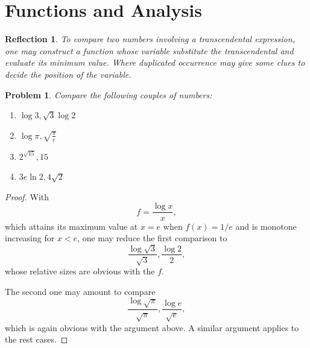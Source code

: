 \documentclass{ctexart}
\newtheorem{refl}{Reflection}
\newtheorem{prob}{Problem}
\newcommand{\pare}[1]{\left(#1\right)}
\begin{document}
\section{Functions and Analysis}
\begin{refl}
To compare two numbers involving a transcendental expression, one may construct a function whose variable substitute the transcendental and evaluate its minimum value. Where duplicated occurrence may give some clues to decide the position of the variable.
\end{refl}
\begin{prob}
Compare the following couples of numbers:
\begin{multicols}{2}
\begin{enumerate}
\item $\log 3, \sqrt{3}\log 2$
\item $\log\pi, \sqrt{\frac{\pi}{e}}$
\item $2^{\sqrt{15}}, 15$
\item $3e\ln 2, 4\sqrt 2$
\end{enumerate}
\end{multicols}
\end{prob}
\begin{proof}
With \[ f = \frac{\log x}{x}, \]
which attains its maximum value at $x=e$ when $f\pare{x} = 1/e$ and is monotone increasing for $x<e$, one may reduce the first comparison to
\[ \frac{\log \sqrt{3}}{\sqrt{3}}, \frac{\log 2}{2}, \]
whose relative sizes are obvious with the $f$.

The second one may amount to compare
\[ \frac{\log \sqrt{\pi}}{\sqrt{\pi}}, \frac{\log e}{\sqrt{e}}, \]
which is again obvious with the argument above. A similar argument applies to the rest cases.
\end{proof}
\end{document}
